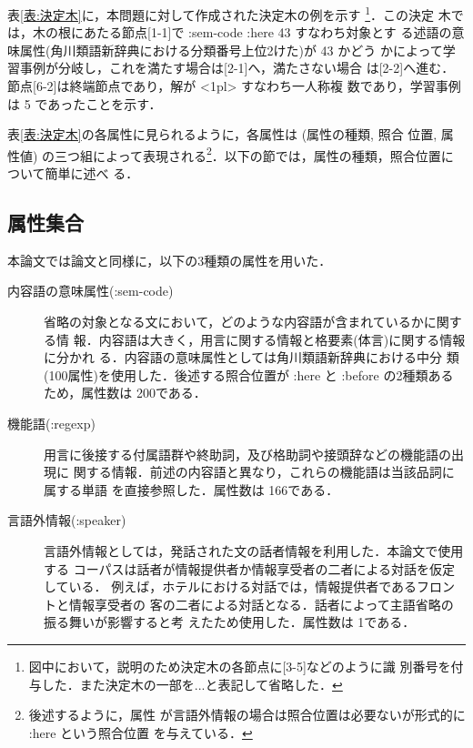 表\ref{表:決定木}に，本問題に対して作成された決定木の例を示す
\footnote{図中において，説明のため決定木の各節点に[3-5]などのように識
別番号を付与した．また決定木の一部を...と表記して省略した．}．この決定
木では，木の根にあたる節点[1-1]で :sem-code :here 43 すなわち対象とす
る述語の意味属性(角川類語新辞典における分類番号上位2けた)が 43 かどう
かによって学習事例が分岐し，これを満たす場合は[2-1]へ，満たさない場合
は[2-2]へ進む．節点[6-2]は終端節点であり，解が <1pl> すなわち一人称複
数であり，学習事例は 5 であったことを示す．


表\ref{表:決定木}の各属性に見られるように，各属性は (属性の種類, 照合
位置, 属性値) の三つ組によって表現される\footnote{後述するように，属性
が言語外情報の場合は照合位置は必要ないが形式的に :here という照合位置
を与えている．}．以下の節では，属性の種類，照合位置について簡単に述べ
る．


\subsection{属性集合}
\label{節:属性}

本論文では論文\cite{主語補完}と同様に，以下の3種類の属性を用いた．


\begin{description}
\item[内容語の意味属性(:sem-code)]

省略の対象となる文において，どのような内容語が含まれているかに関する情
報．内容語は大きく，用言に関する情報と格要素(体言)に関する情報に分かれ
る．内容語の意味属性としては角川類語新辞典\cite{角川類語}における中分
類(100属性)を使用した．後述する照合位置が :here と :before の2種類ある
ため，属性数は 200である．

\item[機能語(:regexp)]

用言に後接する付属語群や終助詞，及び格助詞や接頭辞などの機能語の出現に
関する情報．前述の内容語と異なり，これらの機能語は当該品詞に属する単語
を直接参照した．属性数は 166である．

\item[言語外情報(:speaker)]

言語外情報としては，発話された文の話者情報を利用した．本論文で使用する
コーパスは話者が情報提供者か情報享受者の二者による対話を仮定している．
例えば，ホテルにおける対話では，情報提供者であるフロントと情報享受者の
客の二者による対話となる．話者によって主語省略の振る舞いが影響すると考
えたため使用した．属性数は 1である．

\end{description}

